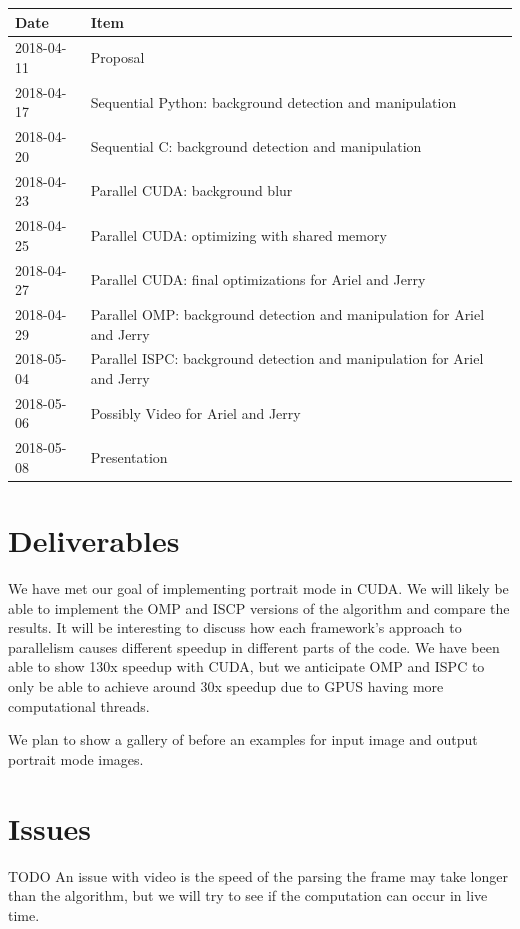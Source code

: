 \documentclass[12pt]{article}
\begin{document}
\begin{tabular}{l|l}
    Date & Item \\
    \hline
    2018-04-11 & Proposal \\
    2018-04-17 & Sequential Python: background detection and manipulation \\
    2018-04-20 & Sequential C: background detection and manipulation \\
    2018-04-23 & Parallel CUDA: background blur\\
    2018-04-25 & Parallel CUDA: optimizing with shared memory\\
    2018-04-27 & Parallel CUDA: final optimizations for Ariel and Jerry\\
    2018-04-29 & Parallel OMP: background detection and manipulation
                 for Ariel and Jerry\\
    2018-05-04 & Parallel ISPC: background detection and manipulation
                 for Ariel and Jerry\\
    2018-05-06 & Possibly Video for Ariel and Jerry\\
    2018-05-08 & Presentation
\end{tabular}

\section{Deliverables}

We have met our goal of implementing portrait mode in CUDA. We will likely be
able to implement the OMP and ISCP versions of the algorithm and compare the
results. It will be interesting to discuss how each framework's approach to
parallelism causes different speedup in different parts of the code. We have
been able to show 130x speedup with CUDA, but we anticipate OMP and ISPC to only
be able to achieve around 30x speedup due to GPUS having more computational
threads.

We plan to show a gallery of before an examples for input image and output
portrait mode images.

\section{Issues}

TODO
An issue with video is the speed of the parsing the frame may take longer than
the algorithm, but we will try to see if the computation can occur in live time.
\end{document}
